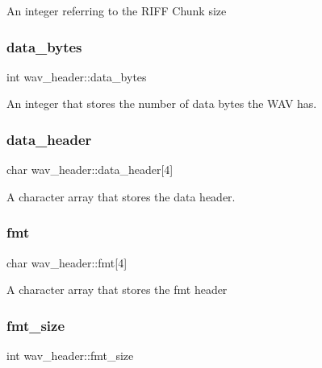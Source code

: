 An integer referring to the R\+I\+FF Chunk size \mbox{\label{structwav__header_a3eeeca270947eab7c7aaee61bbee9b0e}} 
\subsubsection{\texorpdfstring{data\+\_\+bytes}{data\_bytes}}
{\footnotesize\ttfamily int wav\+\_\+header\+::data\+\_\+bytes}

An integer that stores the number of data bytes the W\+AV has. \mbox{\label{structwav__header_ae43fac12459053e98a80e3879c5cd2a7}} 
\subsubsection{\texorpdfstring{data\+\_\+header}{data\_header}}
{\footnotesize\ttfamily char wav\+\_\+header\+::data\+\_\+header\mbox{[}4\mbox{]}}

A character array that stores the data header. \mbox{\label{structwav__header_ad766f550ae18a908d86ba1e72899b4b8}} 
\subsubsection{\texorpdfstring{fmt}{fmt}}
{\footnotesize\ttfamily char wav\+\_\+header\+::fmt\mbox{[}4\mbox{]}}

A character array that stores the fmt header \mbox{\label{structwav__header_a92e6134a93f1c2c7d8084fadc7645823}} 
\subsubsection{\texorpdfstring{fmt\+\_\+size}{fmt\_size}}
{\footnotesize\ttfamily int wav\+\_\+header\+::fmt\+\_\+size}

